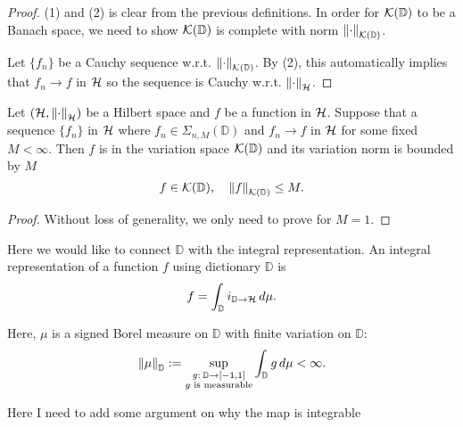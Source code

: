 \begin{proof}
    (1) and (2) is clear from the previous definitions. In order for
    $\mathcal{K}({\mathbb{D}})$ to be a Banach space, we need to show
    $\mathcal{K}({\mathbb{D}})$ is complete with norm $\left\| {\cdot} \right\|_{\mathcal{K}({\mathbb{D}})}$.

    Let $\{f_n\}$ be a Cauchy sequence w.r.t. $\left\| {\cdot} \right\|_{\mathcal{K}({\mathbb{D}})}$. By
    (2), this automatically implies that $f_n \to f$ in $\mathcal{H}$ so the
    sequence is Cauchy w.r.t. $\left\| \cdot \right\|_{\mathcal{H}}$.
\end{proof}



\begin{proposition}

    Let $(\mathcal{H}, \left\| \cdot \right\|_{\mathcal{H}})$ be a Hilbert space and $f$ be a
    function in $\mathcal{H}$. Suppose that a sequence $\{f_n\}$ in $\mathcal{H}$
    where $f_n \in \Sigma_{n,M}(\mathbb{D})$ \TODO and $f_n \to f$ in $\mathcal{H}$
    for some fixed $M < \infty$. Then $f$ is in the variation space
    $\mathcal{K}({\mathbb{D}})$ and its variation norm is bounded by $M$
    \begin{equation}
        f \in \mathcal{K}({\mathbb{D}}), \quad \left\| {f} \right\|_{\mathcal{K}({\mathbb{D}})}\leq M.
    \end{equation}
\end{proposition}

\begin{proof}
    Without loss of generality, we only need to prove for $M = 1$.
\end{proof}


Here we would like to connect $\mathbb{D}$ with the integral representation. An integral representation of a function $f$ using dictionary $\mathbb{D}$ is
\begin{equation}
    f = \int_{\mathbb{D}} i_{{\mathbb{D}}\to{\mathcal{H}}} \,d\mu.
\end{equation}

Here, $\mu$ is a signed Borel measure on $\mathbb{D}$ with finite variation on $\mathbb{D}$:
\begin{equation}
    \label{eq:measure_set_variation}
    \left\| \mu \right\|_{\mathbb{D}} := \sup_{\substack{
            g: \:\mathbb{D} \to [-1, 1] \\ g \textnormal{ is measurable}
        }
    } \int_{\mathbb{D}} g\,d\mu < \infty.
\end{equation}


Here I need to add some argument on why the map is integrable


